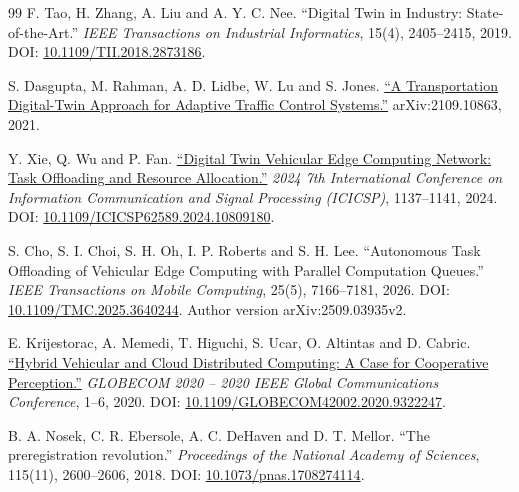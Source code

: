\documentclass[12pt,a4paper]{article}
\begin{document}
\begin{thebibliography}{99}
 F. Tao, H. Zhang, A. Liu and A. Y. C. Nee. ``Digital Twin in Industry: State-of-the-Art.'' \emph{IEEE Transactions on Industrial Informatics}, 15(4), 2405--2415, 2019. DOI: \href{\detokenize{https://doi.org/10.1109/TII.2018.2873186}}{10.1109/TII.2018.2873186}.

 S. Dasgupta, M. Rahman, A. D. Lidbe, W. Lu and S. Jones. \href{\detokenize{https://arxiv.org/abs/2109.10863}}{``A Transportation Digital-Twin Approach for Adaptive Traffic Control Systems.''} arXiv:2109.10863, 2021.

 Y. Xie, Q. Wu and P. Fan. \href{\detokenize{https://arxiv.org/abs/2407.11310}}{``Digital Twin Vehicular Edge Computing Network: Task Offloading and Resource Allocation.''} \emph{2024 7th International Conference on Information Communication and Signal Processing (ICICSP)}, 1137--1141, 2024. DOI: \href{\detokenize{https://doi.org/10.1109/ICICSP62589.2024.10809180}}{10.1109/ICICSP62589.2024.10809180}.

 S. Cho, S. I. Choi, S. H. Oh, I. P. Roberts and S. H. Lee. ``Autonomous Task Offloading of Vehicular Edge Computing with Parallel Computation Queues.'' \emph{IEEE Transactions on Mobile Computing}, 25(5), 7166--7181, 2026. DOI: \href{\detokenize{https://arxiv.org/abs/2509.03935v2}}{10.1109/TMC.2025.3640244}. Author version arXiv:2509.03935v2.

 E. Krijestorac, A. Memedi, T. Higuchi, S. Ucar, O. Altintas and D. Cabric. \href{\detokenize{https://arxiv.org/abs/2010.05693}}{``Hybrid Vehicular and Cloud Distributed Computing: A Case for Cooperative Perception.''} \emph{GLOBECOM 2020 -- 2020 IEEE Global Communications Conference}, 1--6, 2020. DOI: \href{\detokenize{https://doi.org/10.1109/GLOBECOM42002.2020.9322247}}{10.1109/GLOBECOM42002.2020.9322247}.

 B. A. Nosek, C. R. Ebersole, A. C. DeHaven and D. T. Mellor. ``The preregistration revolution.'' \emph{Proceedings of the National Academy of Sciences}, 115(11), 2600--2606, 2018. DOI: \href{\detokenize{https://doi.org/10.1073/pnas.1708274114}}{10.1073/pnas.1708274114}.


\end{thebibliography}
\end{document}
